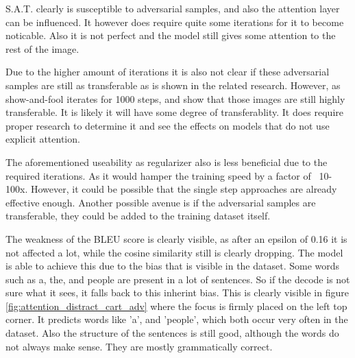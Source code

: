 S.A.T. clearly is susceptible to adversarial samples, and also the attention layer can be influenced. It however does require quite some iterations for it to become noticable. Also it is not perfect and the model still gives some attention to the rest of the image.

Due to the higher amount of iterations it is also not clear if these adversarial samples are still as transferable as is shown in the related research. However, as show-and-fool\cite{Hongge} iterates for 1000 steps, and show that those images are still highly transferable. It is likely it will have some degree of transferablity. It does require proper research to determine it and see the effects on models that do not use explicit attention.

The aforementioned useability as regularizer also is less beneficial due to the required iterations. As it would hamper the training speed by a factor of ~10-100x. However, it could be possible that the single step approaches are already effective enough. Another possible avenue is if the adversarial samples are transferable, they could be added to the training dataset itself.

The weakness of the BLEU score is clearly visible, as after an epsilon of 0.16 it is not affected a lot, while the cosine similarity still is clearly dropping. The model is able to achieve this due to the bias that is visible in the dataset. Some words such as a, the, and people are present in a lot of sentences. So if the decode is not sure what it sees, it falls back to this inherint bias. This is clearly visible in figure \ref{fig:attention_distract_cart_adv} where the focus is firmly placed on the left top corner. It predicts words like 'a', and 'people', which both occur very often in the dataset. Also the structure of the sentences is still good, although the words do not always make sense. They are mostly grammatically correct.
